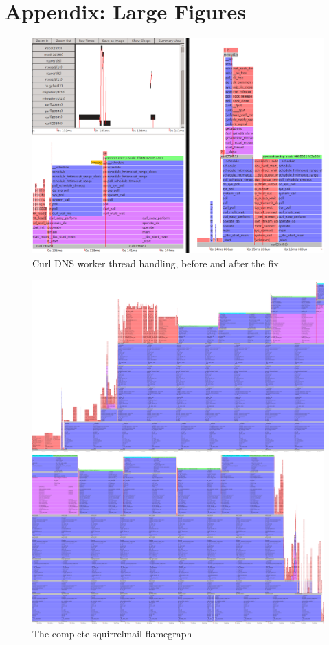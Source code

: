 \documentclass[10pt]{article}
\begin{document}
\newpage

\section{Appendix: Large Figures}

\vspace{1in}

\begin{figure}[h]
\includegraphics[width=6.5in]{images/curlBeforeAndAfter}
\caption{Curl DNS worker thread handling, before and after the fix}
\label{fig:curl}
\end{figure}

\begin{figure}[p]
\includegraphics[width=6.5in]{images/squirrelbest}
\caption{The complete squirrelmail flamegraph}
\label{fig:sq}
\end{figure}
\end{document}
